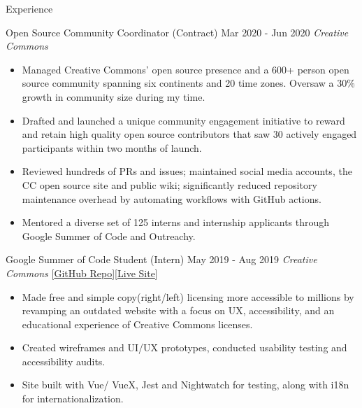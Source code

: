 \documentclass{resume} %
\begin{document}
\begin{rSection}{Experience}
    \begin{rSubsection}
        {Open Source Community Coordinator (Contract)}
        {Mar 2020 - Jun 2020}
        {\em Creative Commons}
        {}
        \begin{itemize}
            \setlength\itemsep{-0.2em}
            \item\small Managed Creative Commons' open source presence and a 600+ person open source community spanning six continents and 20 time zones. Oversaw a 30\% growth in community size during my time.
            \item Drafted and launched a unique community engagement initiative to reward and retain high quality open source contributors that saw 30 actively engaged participants within two months of launch.
            \item Reviewed hundreds of PRs and issues; maintained social media accounts, the CC open source site and public wiki; significantly reduced repository maintenance overhead by automating workflows with GitHub actions.
            \item Mentored a diverse set of 125 interns and internship applicants through Google Summer of Code and Outreachy.
        \end{itemize}
    \end{rSubsection}
    \begin{rSubsection}
        {Google Summer of Code Student (Intern)}
        {May 2019 - Aug 2019}
        {\em Creative Commons}
        {[\href{https://github.com/creativecommons/chooser}{GitHub Repo}][\href{https://chooser-beta.creativecommons.org/}{Live Site}]}
        \begin{itemize}
            \setlength\itemsep{-0.25em}
            \item \small Made free and simple copy(right/left) licensing more accessible to millions by revamping an outdated website with a focus on UX, accessibility, and an educational experience of Creative Commons licenses.
            \item Created wireframes and UI/UX prototypes, conducted usability testing and accessibility audits.
            \item Site built with Vue/ VueX, Jest and Nightwatch for testing, along with i18n for internationalization.
        \end{itemize}
    \end{rSubsection}
\end{rSection}
\end{document}
